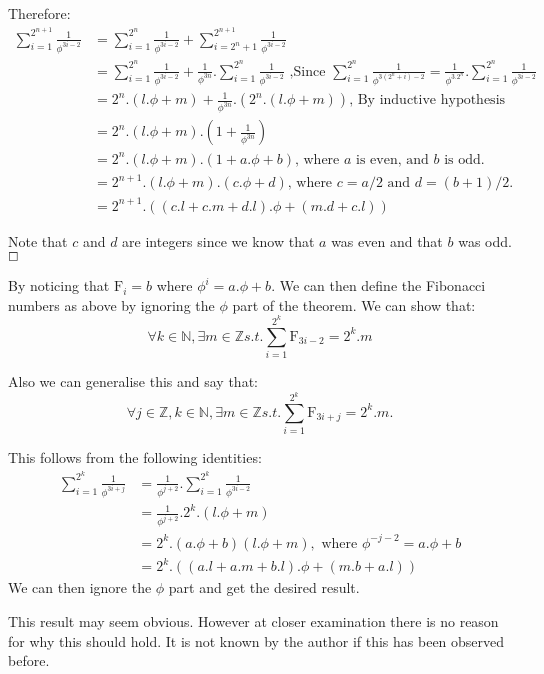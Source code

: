 \documentclass{cs4rep}
\begin{document}
Therefore:
\[ \begin{array}{ll}
\sum_{i=1}^{2^{n+1}} \frac{1}{\phi^{3i-2}} & = \sum_{i=1}^{2^{n}} \frac{1}{\phi^{3i-2}} + \sum_{i=2^{n}+1}^{2^{n+1}} \frac{1}{\phi^{3i-2}} \\
& = \sum_{i=1}^{2^{n}} \frac{1}{\phi^{3i-2}} + \frac{1}{\phi^{3n}}.\sum_{i=1}^{2^{n}} \frac{1}{\phi^{3i-2}} \mbox{ ,Since } \sum_{i=1}^{2^{n}} \frac{1}{\phi^{3(2^{n}+i)-2}} = \frac{1}{\phi^{3.2^{n}}}. \sum_{i=1}^{2^{n}} \frac{1}{\phi^{3i-2}} \\
& = 2^{n}.(l.\phi+m) + \frac{1}{\phi^{3n}}.(2^{n}.(l.\phi+m)) \mbox{, By inductive hypothesis}\\
& = 2^{n}.(l.\phi+m).(1+\frac{1}{\phi^{3n}}) \\
& = 2^{n}.(l.\phi+m).(1+a.\phi+b) \mbox{, where } a \mbox{ is even, and } b \mbox{ is odd.} \\
& = 2^{n+1}.(l.\phi+m).(c.\phi+d) \mbox{, where } c = a/2 \mbox{ and } d = (b+1)/2. \\
& = 2^{n+1}.((c.l+c.m+d.l).\phi+(m.d+c.l))
\end{array} \]

Note that $c$ and $d$ are integers since we know that $a$ was even and
that $b$ was odd.  \hfill $ \boxempty $

By noticing that $\mbox{F}_{i} = b$ where $\phi^{i} = a.\phi+b$.  We
can then define the Fibonacci numbers as above by ignoring the
$\phi$ part of the theorem. We can show that:
\[ \forall k \in \mathbb{N}, \exists m \in \mathbb{Z} s.t. \sum_{i=1}^{2^{k}} \mbox{F}_{3i-2} = 2^{k}.m \]

Also we can generalise this and say that:
\[ \forall j \in \mathbb{Z}, k \in \mathbb{N}, \exists m \in \mathbb{Z} s.t. \sum_{i=1}^{2^{k}} \mbox{F}_{3i+j} = 2^{k}.m. \]

This follows from the following identities:
\[ \begin{array}{ll}
\sum_{i=1}^{2^{k}} \frac{1}{\phi^{3i+j}} & = \frac{1}{\phi^{j+2}}.\sum_{i=1}^{2^{k}} \frac{1}{\phi^{3i-2}} \\
& = \frac{1}{\phi^{j+2}}.2^{k}.(l.\phi+m) \\
& = 2^{k}.(a.\phi+b)(l.\phi+m), \mbox{ where } \phi^{-j-2} = a.\phi+b \\
& = 2^{k}.((a.l+a.m+b.l).\phi+(m.b+a.l))
\end{array} \]
We can then ignore the $\phi$ part and get the desired result.

This result may seem obvious. However at closer examination there is
no reason for why this should hold. It is not known by the author if
this has been observed before.
\end{document}
